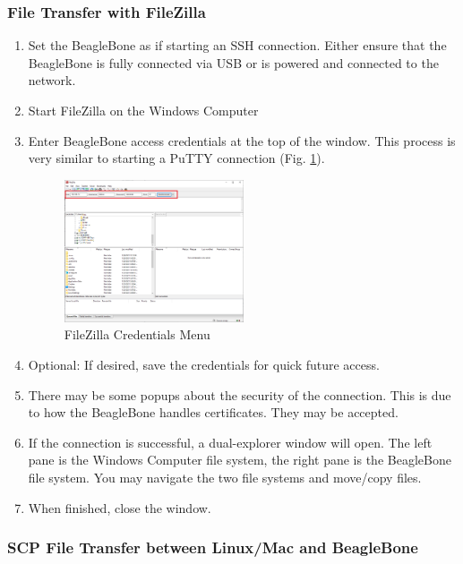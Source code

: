             \subsubsection{File Transfer with FileZilla}
            \begin{enumerate}
                \item Set the BeagleBone as if starting an SSH connection. Either ensure that the BeagleBone is fully connected via USB or is powered and connected to the network.
                \item Start FileZilla on the Windows Computer
                \item Enter BeagleBone access credentials at the top of the window. This process is very similar to starting a PuTTY connection (Fig. \ref{fig:FileZillaCredentials}).
                \begin{figure}[H]
                    \centering
                    \includegraphics[width=0.5\textwidth]{images/beagleboneblack_truckcape_v4_images/FileZillaCredentials.png}
                    \caption{FileZilla Credentials Menu}
                    \label{fig:FileZillaCredentials}
                \end{figure}
                \item Optional: If desired, save the credentials for quick future access.
                \item There may be some popups about the security of the connection. This is due to how the BeagleBone handles certificates. They may be accepted.
                \item If the connection is successful, a dual-explorer window will open. The left pane is the Windows Computer file system, the right pane is the BeagleBone file system. You may navigate the two file systems and move/copy files.
                \item When finished, close the window.
            \end{enumerate}

            \subsubsection{SCP File Transfer between Linux/Mac and BeagleBone}
        
